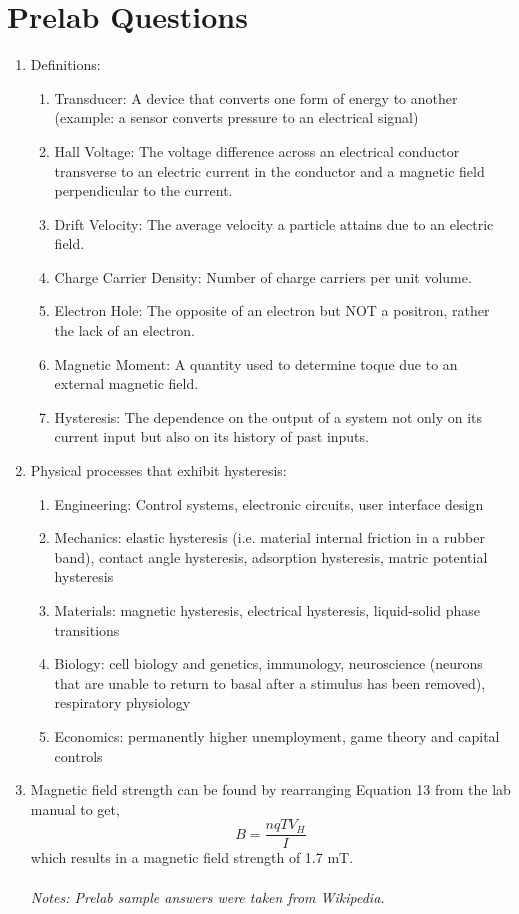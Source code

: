 \section{Prelab Questions}
\begin{enumerate}
\item Definitions:
  \begin{enumerate}
  \item Transducer: A device that converts one form of energy to another (example: a sensor converts pressure to an electrical signal)
  \item Hall Voltage: The voltage difference across an electrical conductor transverse to an electric current in the conductor and a magnetic field perpendicular to the current.
  \item Drift Velocity: The average velocity a particle attains due to an electric field.
  \item Charge Carrier Density: Number of charge carriers per unit volume.
  \item Electron Hole: The opposite of an electron but NOT a positron, rather the lack of an electron.
  \item Magnetic Moment: A quantity used to determine toque due to an external magnetic field.
  \item Hysteresis: The dependence on the output of a system not only on its current input but also on its history of past inputs.
  \end{enumerate}
\item Physical processes that exhibit hysteresis:
  \begin{enumerate}
  \item Engineering: Control systems, electronic circuits, user interface design
  \item Mechanics: elastic hysteresis (i.e. material internal friction in a rubber band), contact angle hysteresis, adsorption hysteresis, matric potential hysteresis
  \item Materials: magnetic hysteresis, electrical hysteresis, liquid-solid phase transitions
  \item Biology: cell biology and genetics, immunology, neuroscience (neurons that are unable to return to basal after a stimulus has been removed), respiratory physiology
  \item Economics: permanently higher unemployment, game theory and capital controls
  \end{enumerate}
\item Magnetic field strength can be found by rearranging Equation 13 from the lab manual to get,
$$
B=\frac{nqTV_H}{I}
$$
which results in a magnetic field strength of 1.7 mT.
\\
\\
\textit{Notes: Prelab sample answers were taken from Wikipedia.}
\end{enumerate}

